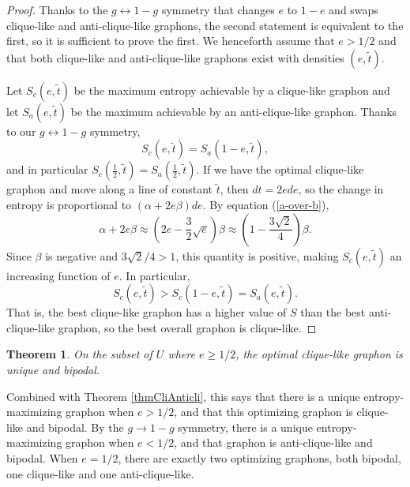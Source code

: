 \documentclass[12pt]{amsart}
\newcommand{\1}{\mathbf{1}}
\newtheorem{theorem}[lemma]{Theorem}
\begin{document}
\begin{proof} Thanks to the $g \leftrightarrow 1-g$ symmetry that changes $e$ to $1-e$ and 
swaps clique-like and anti-clique-like graphons, the second statement is equivalent to the
first, so it is sufficient to prove the first. We henceforth assume that $e>1/2$ and 
that both clique-like and anti-clique-like graphons exist with densities $(e, \tilde t)$.

Let $S_c(e, \tilde t)$ be the maximum entropy achievable by a clique-like graphon and let $S_a(e,\tilde t)$ be the maximum
achievable by an anti-clique-like graphon. Thanks to our $g \leftrightarrow 1-g$ 
symmetry,
\begin{equation}
S_c(e,\tilde t) = S_a(1-e, \tilde t),
\end{equation}  
and in particular $S_c(\frac12, \tilde t) = S_a(\frac12, \tilde t)$. 
If we have the optimal clique-like graphon and move along a line of constant $\tilde t$, 
then $dt = 2e de$, so 
the change in entropy is proportional to $(\alpha +2 e \beta) de$. By equation 
(\ref{a-over-b}), 
\begin{equation} \alpha + 2e \beta \approx \left ( 2e - \frac32 \sqrt{e} \right ) \beta
\approx \left ( 1 - \frac{3\sqrt{2}}{4} \right ) \beta. \end{equation} 
Since $\beta$ is negative and $3 \sqrt{2}/4 > 1$, this quantity is positive, making 
$S_c(e,\tilde t)$ an increasing function of $e$.  
In particular,
\begin{equation}
S_c(e, \tilde t) > S_c(1-e, \tilde t) = S_a(e,\tilde t).
\end{equation} 
That is, the best clique-like graphon has a higher value of $S$ 
than the best anti-clique-like graphon, so the best overall graphon is clique-like.  
\end{proof}


\begin{theorem}\label{thm2}
On the subset of $U$ where $e \ge 1/2$, the optimal clique-like graphon is unique and bipodal. 
\end{theorem}

Combined with Theorem \ref{thmCliAnticli}, this says that there is a unique entropy-maximizing graphon when $e>1/2$, and that this 
optimizing graphon is clique-like and bipodal. By the $g \to 1-g$ symmetry, there is a unique entropy-maximizing graphon when
$e < 1/2$, and that graphon is anti-clique-like and bipodal. When $e=1/2$, there are exactly two optimizing graphons, both 
bipodal, one clique-like and one anti-clique-like.
\end{document}
